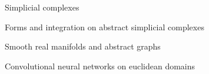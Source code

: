 \documentclass[../main.tex]{subfiles}
\begin{document}
    \begin{subsection}{Simplicial complexes}
            
    \end{subsection}
    \begin{subsection}{Forms and integration on abstract simplicial complexes}
            
    \end{subsection}
    \begin{subsection}{Smooth real manifolds and abstract graphs}
        
    \end{subsection}
    \begin{subsection}{Convolutional neural networks on euclidean domains}
        
    \end{subsection}
\end{document}
